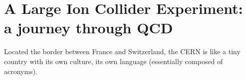 \newpage
\chapter{A Large Ion Collider Experiment: a journey through QCD}
\label{sec:Section02}

Located the border between France and Switzerland, the CERN is like a tiny country with its own culture, its own language (essentially composed of acronyms).